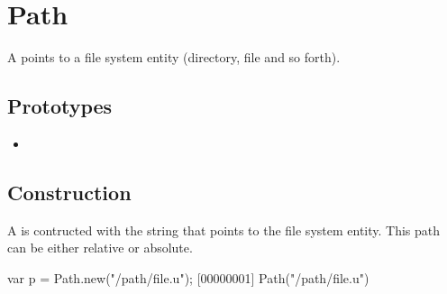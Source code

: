 \section{Path}

A  points to a file system entity (directory, file and so
forth).

\subsection{Prototypes}
\begin{itemize}
\item {}
\end{itemize}

\subsection{Construction}

A  is contructed with the string that points to the
file system entity. This path can be either relative or absolute.

\begin{urbiscript}
var p = Path.new("/path/file.u");
[00000001] Path("/path/file.u")
\end{urbiscript}

